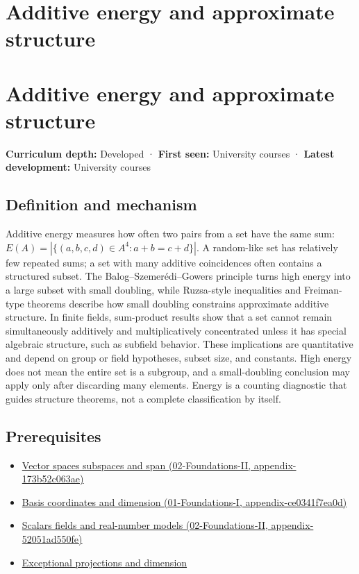 \hypertarget{appendix-b0732b22e7d6}{}
\section*{Additive energy and approximate structure}
\section{Additive energy and approximate structure}\label{appendix-b0732b22e7d6-additive-energy-and-approximate-structure}

\textbf{Curriculum depth:} Developed · \textbf{First seen:} University courses · \textbf{Latest development:} University courses

\subsection{Definition and mechanism}\label{appendix-b0732b22e7d6-definition-and-mechanism}

Additive energy measures how often two pairs from a set have the same sum: \(E(A)=|\{(a,b,c,d)\in A^4:a+b=c+d\}|\). A random-like set has relatively few repeated sums; a set with many additive coincidences often contains a structured subset. The Balog--Szemerédi--Gowers principle turns high energy into a large subset with small doubling, while Ruzsa-style inequalities and Freiman-type theorems describe how small doubling constrains approximate additive structure. In finite fields, sum-product results show that a set cannot remain simultaneously additively and multiplicatively concentrated unless it has special algebraic structure, such as subfield behavior. These implications are quantitative and depend on group or field hypotheses, subset size, and constants. High energy does not mean the entire set is a subgroup, and a small-doubling conclusion may apply only after discarding many elements. Energy is a counting diagnostic that guides structure theorems, not a complete classification by itself.

\subsection{Prerequisites}\label{appendix-b0732b22e7d6-prerequisites}

\begin{itemize}
\tightlist
\item
  \href{../02-Foundations-II/main.pdf\#nameddest=appendix-173b52c063ae}{Vector spaces subspaces and span (02-Foundations-II, appendix-173b52c063ae)}
\item
  \href{../01-Foundations-I/main.pdf\#nameddest=appendix-ce0341f7ea0d}{Basis coordinates and dimension (01-Foundations-I, appendix-ce0341f7ea0d)}
\item
  \href{../02-Foundations-II/main.pdf\#nameddest=appendix-52051ad550fe}{Scalars fields and real-number models (02-Foundations-II, appendix-52051ad550fe)}
\item
  \hyperref[appendix-3c73f7862157]{Exceptional projections and dimension}
\end{itemize}

